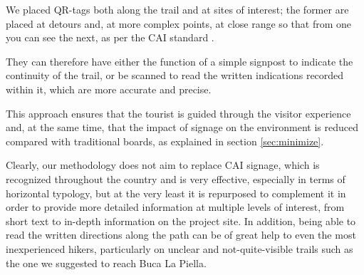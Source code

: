 \documentclass[sustainability,article,submit,pdftex,moreauthors]{Definitions/mdpi}
\begin{document}
We placed QR-tags both along the trail and at sites of interest; the former are placed at detours and, at more complex points, at close range so that from one you can see the next, as per the CAI standard \cite{cai10}.

They can therefore have either the function of a simple signpost to indicate the continuity of the trail, or be scanned to read the written indications recorded within it, which are more accurate and precise. 


This approach ensures that the tourist is guided through the visitor experience and, at the same time, that the impact of signage on the environment is reduced compared with traditional boards, as explained in section \ref{sec:minimize}.


Clearly, our methodology does not aim to replace CAI signage, which is recognized throughout the country and is very effective, especially in terms of horizontal typology, but at the very least it is repurposed to complement it in order to provide more detailed information at multiple levels of interest, from short text to in-depth information on the project site. In addition, being able to read the written directions along the path can be of great help to even the most inexperienced hikers, particularly on unclear and not-quite-visible trails such as the one we suggested to reach Buca La Piella.









\end{document}
